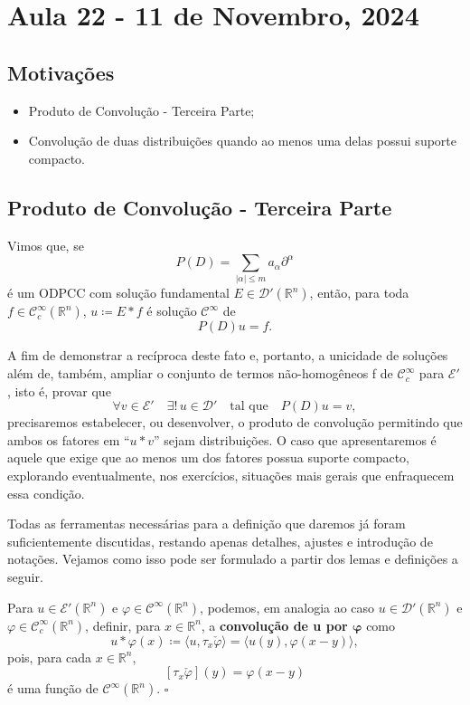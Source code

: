 \documentclass[../distribution_theory_notes.tex]{subfiles}
\begin{document}
\section{Aula 22 - 11 de Novembro, 2024}
\subsection{Motivações}
\begin{itemize}
	\item Produto de Convolução - Terceira Parte;
	\item Convolução de duas distribuições quando ao menos uma delas possui suporte compacto.
\end{itemize}

\subsection{Produto de Convolução - Terceira Parte}
Vimos que, se
\[
	P(D)=\sum\limits_{|\alpha|\leq m}a_{\alpha}\partial^{\alpha}
\]
é um ODPCC com solução fundamental \(E\in \mathcal{D}'(\mathbb{R}^{n})\), então, para toda \(f\in \mathcal{C}_{c}^{\infty}(\mathbb{R}^{n})\), \(u\coloneqq E*f\) é solução \(\mathcal{C}^{\infty}\) de
\[
	P(D)u=f.
\]

A fim de demonstrar a recíproca deste fato e, portanto, a unicidade de soluções além de, também, ampliar o conjunto de termos não-homogêneos f de \(\mathcal{C}_{c}^{\infty}\) para \(\mathcal{E}'\), isto é, provar que
\[
	\forall v\in \mathcal{E}'\quad \exists!\,u\in \mathcal{D}'\quad\text{tal que}\quad P(D)u=v,
\]
precisaremos estabelecer, ou desenvolver, o produto de convolução permitindo que ambos os fatores em ``\(u*v\)'' sejam distribuições. O caso que apresentaremos é aquele que exige que ao menos um dos fatores possua suporte compacto, explorando eventualmente, nos exercícios, situações mais gerais que enfraquecem essa condição.

Todas as ferramentas necessárias para a definição que daremos já foram suficientemente discutidas, restando apenas detalhes, ajustes e introdução de notações. Vejamos como isso pode ser formulado a partir dos lemas e definições a seguir.

\begin{def*}
	Para \(u\in \mathcal{E}'(\mathbb{R}^{n})\) e \(\varphi\in \mathcal{C}^{\infty}(\mathbb{R}^{n})\), podemos, em analogia ao caso \(u\in \mathcal{D}'(\mathbb{R}^{n})\) e \(\varphi\in \mathcal{C}_{c}^{\infty}(\mathbb{R}^{n})\), definir, para \(x\in \mathbb{R}^{n}\), a \textbf{convolução de u por \(\mathbf{\varphi}\)} como
	\[
		u*\varphi(x)\coloneqq \langle u,\tau_{x}\check{\varphi}\rangle
		=\langle u(y),\varphi(x-y)\rangle,
	\]
	pois, para cada \(x\in \mathbb{R}^{n}\),
	\[
		[\tau_{x}\check{\varphi}](y)=\varphi(x-y)
	\]
	é uma função de \(\mathcal{C}^{\infty}(\mathbb{R}^{n})\). \(\square\)
\end{def*}
\end{document}
